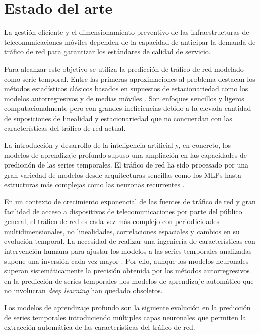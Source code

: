 \chapter{Estado del arte}
\label{cap2:arte}

La gestión eficiente y el dimensionamiento preventivo de las infraestructuras de telecomunicaciones móviles dependen de la capacidad de anticipar la demanda de tráfico de red para garantizar los estándares de calidad de servicio.

Para alcanzar este objetivo se utiliza la predicción de tráfico de red modelado como serie temporal. Entre las primeras aproximaciones al problema destacan los métodos estadísticos clásicos basados en supuestos de estacionariedad como los modelos autorregresivos y de medias móviles \cite{arma,arma1,arma2,arma3,arima1,arima2,sarima1}. Son enfoques sencillos y ligeros computacionalmente pero con grandes ineficiencias debido a la elevada cantidad de suposiciones de linealidad y estacionariedad que no concuerdan con las características del tráfico de red actual.

La introducción y desarrollo de la inteligencia artificial y, en concreto, los modelos de aprendizaje profundo supuso una ampliación en las capacidades de predicción de las series temporales. El tráfico de red ha sido procesado por una gran variedad de modelos desde arquitecturas sencillas como los MLPs hasta estructuras más complejas como las neuronas recurrentes \cite{SKIMAcasaseca,tfgalicia}.

En un contexto de crecimiento exponencial de las fuentes de tráfico de red y gran facilidad de acceso a dispositivos de telecomunicaciones por parte del público general, el tráfico de red es cada vez más complejo con periodicidades multidimensionales, no linealidades, correlaciones espaciales y cambios en su evolución temporal. La necesidad de realizar una ingeniería de características con intervención humana para ajustar los modelos a las series temporales analizadas supone una inversión cada vez mayor \cite{deeplearning}. Por ello, aunque los modelos neuronales superan sistemáticamente la precisión obtenida por los métodos autorregresivos en la predicción de series temporales \cite{tfgalicia},los modelos de aprendizaje automático que no involucran \textit{deep learning} han quedado obsoletos.

Los modelos de aprendizaje profundo son la siguiente evolución en la predicción de series temporales introduciendo múltiples capas neuronales que permiten la extracción automática de las características del tráfico de red.

